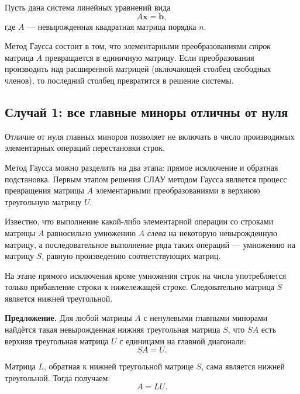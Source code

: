 \documentclass[11pt,a4paper]{article}
\begin{document}
Пусть дана система линейных уравнений вида
\[ A \mathbf{x} = \mathbf{b}, \] где \(A\) --- невырожденная квадратная
матрица порядка \(n\).

Метод Гаусса состоит в том, что элементарными преобразованиями
\emph{строк} матрица \(A\) превращается в единичную матрицу. Если
преобразования производить над расширенной матрицей (включающей столбец
свободных членов), то последний столбец превратится в решение системы.

    \hypertarget{ux441ux43bux443ux447ux430ux439-1-ux432ux441ux435-ux433ux43bux430ux432ux43dux44bux435-ux43cux438ux43dux43eux440ux44b-ux43eux442ux43bux438ux447ux43dux44b-ux43eux442-ux43dux443ux43bux44f}{%
\subsection{Случай 1: все главные миноры отличны от
нуля}\label{ux441ux43bux443ux447ux430ux439-1-ux432ux441ux435-ux433ux43bux430ux432ux43dux44bux435-ux43cux438ux43dux43eux440ux44b-ux43eux442ux43bux438ux447ux43dux44b-ux43eux442-ux43dux443ux43bux44f}}

Отличие от нуля главных миноров позволяет не включать в число
производимых элементарных операций перестановки строк.

Метод Гаусса можно разделить на два этапа: прямое исключение и обратная
подстановка. Первым этапом решения СЛАУ методом Гаусса является процесс
превращения матрицы \(A\) элементарными преобразованиями в верхнюю
треугольную матрицу \(U\).

Известно, что выполнение какой-либо элементарной операции со строками
матрицы \(A\) равносильно умножению \(A\) \emph{слева} на некоторую
невырожденную матрицу, а последовательное выполнение ряда таких операций
--- умножению на матрицу \(S\), равную произведению соответствующих
матриц.

На этапе прямого исключения кроме умножения строк на числа употребляется
только прибавление строки к нижележащей строке. Следовательно матрица
\(S\) является нижней треугольной.

\textbf{Предложение.} Для любой матрицы \(A\) с ненулевыми главными
минорами найдётся такая невырожденная нижняя треугольная матрица \(S\),
что \(SA\) есть верхняя треугольная матрица \(U\) с единицами на главной
диагонали: \[ SA = U. \]

Матрица \(L\), обратная к нижней треугольной матрице \(S\), сама
является нижней треугольной. Тогда получаем: \[ A = LU. \]
\end{document}
